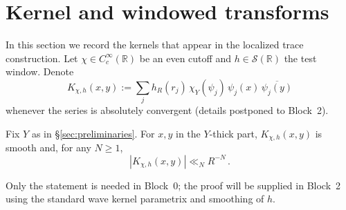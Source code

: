\section{Kernel and windowed transforms}\label{sec:kernel}

In this section we record the kernels that appear in the localized trace
construction. Let $\chi\in C_c^\infty(\mathbb{R})$ be an even cutoff and
$h\in\mathcal{S}(\mathbb{R})$ the test window. Denote
\[
  K_{\chi,h}(x,y) := \sum_{j} h_R(r_j)\,\chi_Y(\psi_j)\,\psi_j(x)\,\overline{\psi_j(y)}
\]
whenever the series is absolutely convergent (details postponed to Block~2).

\begin{lemma}\label{lem:kernel-decay}
Fix $Y$ as in \S\ref{sec:preliminaries}. For $x,y$ in the $Y$-thick part,
$K_{\chi,h}(x,y)$ is smooth and, for any $N\ge1$,
\[
  |K_{\chi,h}(x,y)| \ll_N R^{-N}\,.
\]
\end{lemma}

\begin{remark}
Only the statement is needed in Block~0; the proof will be supplied in
Block~2 using the standard wave kernel parametrix and smoothing of $h$.
\end{remark}
